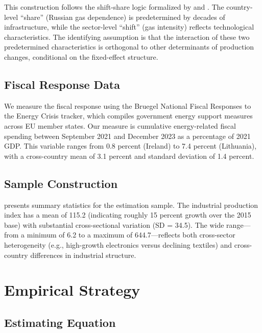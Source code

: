 \documentclass[12pt]{article}
\begin{document}
This construction follows the shift-share logic formalized by \citet{goldsmith2020} and \citet{borusyak2022}. The country-level ``share'' (Russian gas dependence) is predetermined by decades of infrastructure, while the sector-level ``shift'' (gas intensity) reflects technological characteristics. The identifying assumption is that the interaction of these two predetermined characteristics is orthogonal to other determinants of production changes, conditional on the fixed-effect structure.

\subsection{Fiscal Response Data}

We measure the fiscal response using the Bruegel National Fiscal Responses to the Energy Crisis tracker, which compiles government energy support measures across EU member states. Our measure is cumulative energy-related fiscal spending between September 2021 and December 2023 as a percentage of 2021 GDP. This variable ranges from 0.8 percent (Ireland) to 7.4 percent (Lithuania), with a cross-country mean of 3.1 percent and standard deviation of 1.4 percent.

\subsection{Sample Construction}

 presents summary statistics for the estimation sample. The industrial production index has a mean of 115.2 (indicating roughly 15 percent growth over the 2015 base) with substantial cross-sectional variation (SD = 34.5). The wide range---from a minimum of 6.2 to a maximum of 644.7---reflects both cross-sector heterogeneity (e.g., high-growth electronics versus declining textiles) and cross-country differences in industrial structure.




\section{Empirical Strategy}
\label{sec:strategy}

\subsection{Estimating Equation}
\end{document}
